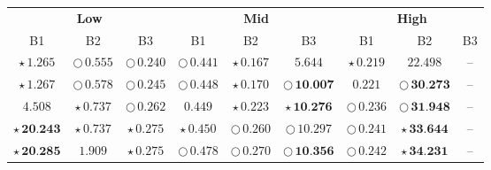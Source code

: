 \documentclass[
]{article}
\begin{document}
\begin{table}[!h]
\centering
\begin{tabular}[t]{ccccccccc}
\toprule
\multicolumn{3}{c}{\textbf{Low}} & \multicolumn{3}{c}{\textbf{Mid}} & \multicolumn{3}{c}{\textbf{High}} \\
\cmidrule(l{3pt}r{3pt}){1-3} \cmidrule(l{3pt}r{3pt}){4-6} \cmidrule(l{3pt}r{3pt}){7-9}
B1 & B2 & B3 & B1 & B2 & B3 & B1 & B2 & B3\\
\midrule
\cellcolor[HTML]{2297E6}$\star\,\textit{1.265}$ & \cellcolor[HTML]{2297E6}$\bigcirc\,\textit{0.555}$ & \cellcolor[HTML]{2297E6}$\bigcirc\,\textit{0.240}$ & \cellcolor[HTML]{2297E6}$\bigcirc\,\textit{0.441}$ & \cellcolor[HTML]{DF536B}$\star\,\textit{0.167}$ & \cellcolor[HTML]{FFFFFF}$5.644$ & \cellcolor[HTML]{F5C710}$\star\,\textit{0.219}$ & \cellcolor[HTML]{FFFFFF}$22.498$ & --\\
\cellcolor[HTML]{DF536B}$\star\,\textit{1.267}$ & \cellcolor[HTML]{DF536B}$\bigcirc\,\textit{0.578}$ & \cellcolor[HTML]{DF536B}$\bigcirc\,\textit{0.245}$ & \cellcolor[HTML]{F5C710}$\bigcirc\,\textit{0.448}$ & \cellcolor[HTML]{2297E6}$\star\,\textit{0.170}$ & \cellcolor[HTML]{DF536B}$\bigcirc\,\textbf{10.007}$ & \cellcolor[HTML]{FFFFFF}$0.221$ & \cellcolor[HTML]{F5C710}$\bigcirc\,\textbf{30.273}$ & --\\
\cellcolor[HTML]{FFFFFF}$4.508$ & \cellcolor[HTML]{DF536B}$\star\,\textit{0.737}$ & \cellcolor[HTML]{F5C710}$\bigcirc\,\textit{0.262}$ & \cellcolor[HTML]{FFFFFF}$0.449$ & \cellcolor[HTML]{F5C710}$\star\,\textit{0.223}$ & \cellcolor[HTML]{DF536B}$\star\,\textbf{10.276}$ & \cellcolor[HTML]{2297E6}$\bigcirc\,\textit{0.236}$ & \cellcolor[HTML]{DF536B}$\bigcirc\,\textbf{31.948}$ & --\\
\cellcolor[HTML]{2297E6}$\star\,\textbf{20.243}$ & \cellcolor[HTML]{2297E6}$\star\,\textit{0.737}$ & \cellcolor[HTML]{2297E6}$\star\,\textit{0.275}$ & \cellcolor[HTML]{F5C710}$\star\,\textit{0.450}$ & \cellcolor[HTML]{2297E6}$\bigcirc\,\textit{0.260}$ & \cellcolor[HTML]{F5C710}$\bigcirc\,\textit{10.297}$ & \cellcolor[HTML]{DF536B}$\bigcirc\,\textit{0.241}$ & \cellcolor[HTML]{2297E6}$\star\,\textbf{33.644}$ & --\\
\cellcolor[HTML]{DF536B}$\star\,\textbf{20.285}$ & \cellcolor[HTML]{FFFFFF}$1.909$ & \cellcolor[HTML]{DF536B}$\star\,\textit{0.275}$ & \cellcolor[HTML]{DF536B}$\bigcirc\,\textit{0.478}$ & \cellcolor[HTML]{F5C710}$\bigcirc\,\textit{0.270}$ & \cellcolor[HTML]{2297E6}$\bigcirc\,\textbf{10.356}$ & \cellcolor[HTML]{F5C710}$\bigcirc\,\textit{0.242}$ & \cellcolor[HTML]{DF536B}$\star\,\textbf{34.231}$ & --\\

\end{tabular}
\end{table}
\end{document}
